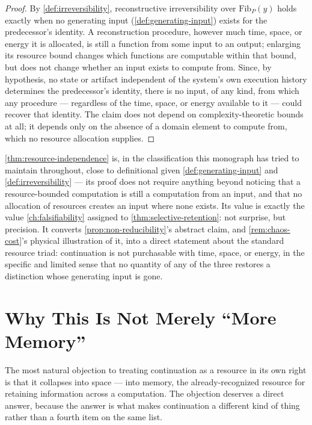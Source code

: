 \documentclass[11pt]{book}
\theoremstyle{plain}
\theoremstyle{definition}
\theoremstyle{remark}
\begin{document}
\begin{proof}
By \cref{def:irreversibility}, reconstructive irreversibility over
$\mathrm{Fib}_P(y)$ holds exactly when no generating input
(\cref{def:generating-input}) exists for the predecessor's identity.
A reconstruction procedure, however much time, space, or energy it is
allocated, is still a function from some input to an output; enlarging
its resource bound changes which functions are computable within that
bound, but does not change whether an input exists to compute from.
Since, by hypothesis, no state or artifact independent of the
system's own execution history determines the predecessor's identity,
there is no input, of any kind, from which any procedure --- regardless
of the time, space, or energy available to it --- could recover that
identity. The claim does not depend on complexity-theoretic bounds at
all; it depends only on the absence of a domain element to compute
from, which no resource allocation supplies.
\end{proof}

\cref{thm:resource-independence} is, in the classification this
monograph has tried to maintain throughout, close to definitional
given \cref{def:generating-input} and \cref{def:irreversibility} ---
its proof does not require anything beyond noticing that a
resource-bounded computation is still a computation from an input, and
that no allocation of resources creates an input where none exists.
Its value is exactly the value \cref{ch:falsifiability} assigned to
\cref{thm:selective-retention}: not surprise, but precision. It
converts \cref{prop:non-reducibility}'s abstract claim, and
\cref{rem:chaos-cost}'s physical illustration of it, into a direct
statement about the standard resource triad: continuation is not
purchasable with time, space, or energy, in the specific and limited
sense that no quantity of any of the three restores a distinction
whose generating input is gone.

\section{Why This Is Not Merely \enquote{More Memory}}

The most natural objection to treating continuation as a resource in
its own right is that it collapses into space --- into memory, the
already-recognized resource for retaining information across a
computation. The objection deserves a direct answer, because the
answer is what makes continuation a different kind of thing rather
than a fourth item on the same list.
\end{document}
